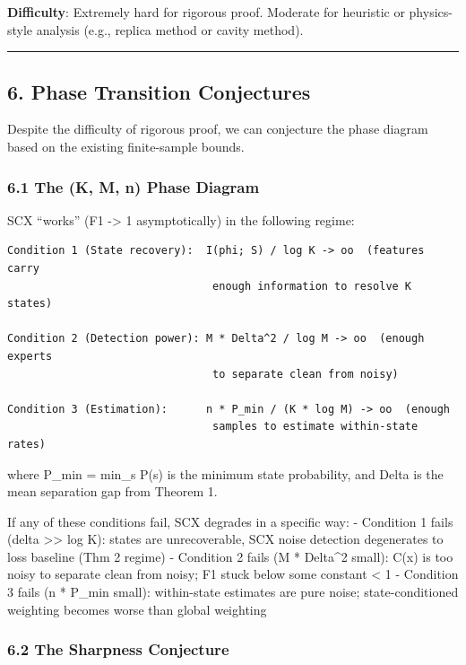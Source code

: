 \documentclass[
  12pt,
]{ctexart}
\begin{document}
\textbf{Difficulty}: Extremely hard for rigorous proof. Moderate for
heuristic or physics-style analysis (e.g., replica method or cavity
method).

\begin{center}\rule{0.5\linewidth}{0.5pt}\end{center}

\subsection{6. Phase Transition
Conjectures}\label{phase-transition-conjectures}

Despite the difficulty of rigorous proof, we can conjecture the phase
diagram based on the existing finite-sample bounds.

\subsubsection{6.1 The (K, M, n) Phase
Diagram}\label{the-k-m-n-phase-diagram}

SCX ``works'' (F1 -\textgreater{} 1 asymptotically) in the following
regime:

\begin{verbatim}
Condition 1 (State recovery):  I(phi; S) / log K -> oo  (features carry
                                enough information to resolve K states)

Condition 2 (Detection power): M * Delta^2 / log M -> oo  (enough experts
                                to separate clean from noisy)

Condition 3 (Estimation):      n * P_min / (K * log M) -> oo  (enough
                                samples to estimate within-state rates)
\end{verbatim}

where P\_min = min\_s P(s) is the minimum state probability, and Delta
is the mean separation gap from Theorem 1.

If any of these conditions fail, SCX degrades in a specific way: -
Condition 1 fails (delta \textgreater\textgreater{} log K): states are
unrecoverable, SCX noise detection degenerates to loss baseline (Thm 2
regime) - Condition 2 fails (M * Delta\^{}2 small): C(x) is too noisy to
separate clean from noisy; F1 stuck below some constant \textless{} 1 -
Condition 3 fails (n * P\_min small): within-state estimates are pure
noise; state-conditioned weighting becomes worse than global weighting

\subsubsection{6.2 The Sharpness
Conjecture}\label{the-sharpness-conjecture}
\end{document}
